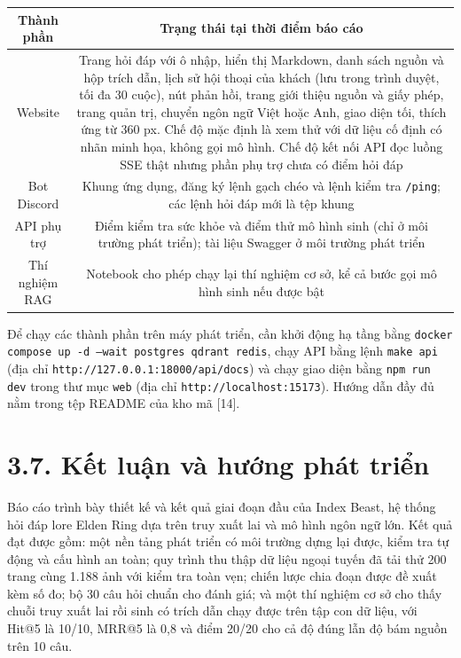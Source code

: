 \begin{longtable*}{|C{0.22}|C{0.78}|}
\hline \textbf{Thành phần} & \textbf{Trạng thái tại thời điểm báo cáo} \\ \hline
Website & Trang hỏi đáp với ô nhập, hiển thị Markdown, danh sách nguồn và hộp trích dẫn, lịch sử hội thoại của khách (lưu trong trình duyệt, tối đa 30 cuộc), nút phản hồi, trang giới thiệu nguồn và giấy phép, trang quản trị, chuyển ngôn ngữ Việt hoặc Anh, giao diện tối, thích ứng từ 360 px. Chế độ mặc định là xem thử với dữ liệu cố định có nhãn minh họa, không gọi mô hình. Chế độ kết nối API đọc luồng SSE thật nhưng phần phụ trợ chưa có điểm hỏi đáp \\ \hline
Bot Discord & Khung ứng dụng, đăng ký lệnh gạch chéo và lệnh kiểm tra \texttt{/ping}; các lệnh hỏi đáp mới là tệp khung \\ \hline
API phụ trợ & Điểm kiểm tra sức khỏe và điểm thử mô hình sinh (chỉ ở môi trường phát triển); tài liệu Swagger ở môi trường phát triển \\ \hline
Thí nghiệm RAG & Notebook cho phép chạy lại thí nghiệm cơ sở, kể cả bước gọi mô hình sinh nếu được bật \\ \hline
\end{longtable*}
\tabend


Để chạy các thành phần trên máy phát triển, cần khởi động hạ tầng bằng \texttt{docker compose up -d --wait postgres qdrant redis}, chạy API bằng lệnh \texttt{make api} (địa chỉ \texttt{http://127.0.0.1:18000/api/docs}) và chạy giao diện bằng \texttt{npm run dev} trong thư mục \texttt{web} (địa chỉ \texttt{http://localhost:15173}). Hướng dẫn đầy đủ nằm trong tệp README của kho mã [14].


\section{3.7. Kết luận và hướng phát triển}

Báo cáo trình bày thiết kế và kết quả giai đoạn đầu của Index Beast, hệ thống hỏi đáp lore Elden Ring dựa trên truy xuất lai và mô hình ngôn ngữ lớn. Kết quả đạt được gồm: một nền tảng phát triển có môi trường dựng lại được, kiểm tra tự động và cấu hình an toàn; quy trình thu thập dữ liệu ngoại tuyến đã tải thử 200 trang cùng 1.188 ảnh với kiểm tra toàn vẹn; chiến lược chia đoạn được đề xuất kèm số đo; bộ 30 câu hỏi chuẩn cho đánh giá; và một thí nghiệm cơ sở cho thấy chuỗi truy xuất lai rồi sinh có trích dẫn chạy được trên tập con dữ liệu, với Hit@5 là 10/10, MRR@5 là 0,8 và điểm 20/20 cho cả độ đúng lẫn độ bám nguồn trên 10 câu.



